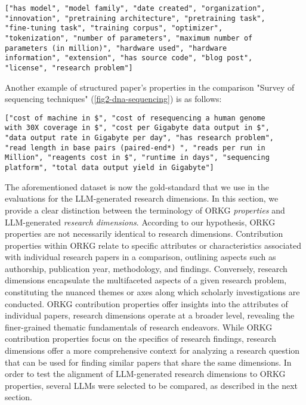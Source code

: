 \begin{verbatim}
["has model", "model family", "date created", "organization",
"innovation", "pretraining architecture", "pretraining task",
"fine-tuning task", "training corpus", "optimizer", 
"tokenization", "number of parameters", "maximum number of 
parameters (in million)", "hardware used", "hardware 
information", "extension", "has source code", "blog post", 
"license", "research problem"]
\end{verbatim}

Another example of structured paper's properties in the comparison "Survey of sequencing techniques" (\autoref{fig2-dna-sequencing}) is as follows: 

\begin{verbatim}
["cost of machine in $", "cost of resequencing a human genome 
with 30X coverage in $", "cost per Gigabyte data output in $", 
"data output rate in Gigabyte per day", "has research problem", 
"read length in base pairs (paired-end*) ", "reads per run in 
Million", "reagents cost in $", "runtime in days", "sequencing 
platform", "total data output yield in Gigabyte"]
\end{verbatim}

The aforementioned dataset is now the gold-standard that we use in the evaluations for the LLM-generated research dimensions. In this section, we provide a clear distinction between the terminology of ORKG \textit{properties} and LLM-generated \textit{research dimensions}. According to our hypothesis, ORKG properties are not necessarily identical to research dimensions. Contribution properties within ORKG relate to specific attributes or characteristics associated with individual research papers in a comparison, outlining aspects such as authorship, publication year, methodology, and findings. Conversely, research dimensions encapsulate the multifaceted aspects of a given research problem, constituting the nuanced themes or axes along which scholarly investigations are conducted. ORKG contribution properties offer insights into the attributes of individual papers, research dimensions operate at a broader level, revealing the finer-grained thematic fundamentals of research endeavors. While ORKG contribution properties focus on the specifics of research findings, research dimensions offer a more comprehensive context for analyzing a research question that can be used for finding similar papers that share the same dimensions. In order to test the alignment of LLM-generated research dimensions to ORKG properties, several LLMs were selected to be compared, as described in the next section.

